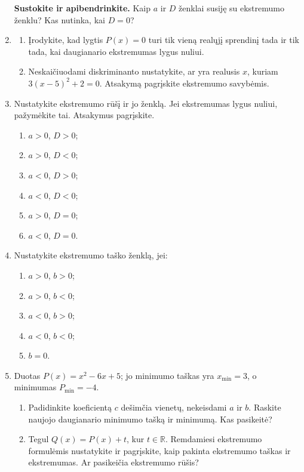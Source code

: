 \documentclass[12pt,a4paper]{article}
\begin{document}
\begin{enumerate}
\begin{enumerate}
\end{enumerate}
\par\medskip
\textbf{Sustokite ir apibendrinkite.} Kaip $a$ ir $D$ ženklai susiję su ekstremumo ženklu? Kas nutinka, kai $D=0$?
\item \begin{enumerate}
\item Įrodykite, kad lygtis $P(x)=0$ turi tik vieną realųjį sprendinį tada ir tik tada, kai daugianario ekstremumas lygus nuliui.
\item Neskaičiuodami diskriminanto nustatykite, ar yra realusis $x$, kuriam $3(x-5)^2+2=0$. Atsakymą pagrįskite ekstremumo savybėmis.
\end{enumerate}
\item Nustatykite ekstremumo rūšį ir jo ženklą. Jei ekstremumas lygus nuliui, pažymėkite tai. Atsakymus pagrįskite.
\begin{multicols}{2}\begin{enumerate}
\item $a>0$, $D>0$; \item $a>0$, $D<0$; \item $a<0$, $D>0$; \item $a<0$, $D<0$; \item $a>0$, $D=0$; \item $a<0$, $D=0$.
\end{enumerate}\end{multicols}
\item Nustatykite ekstremumo taško ženklą, jei:
\begin{multicols}{2}\begin{enumerate}
\item $a>0$, $b>0$; \item $a>0$, $b<0$; \item $a<0$, $b>0$; \item $a<0$, $b<0$; \item $b=0$.
\end{enumerate}\end{multicols}
\item Duotas $P(x)=x^2-6x+5$; jo minimumo taškas yra $x_{\min}=3$, o minimumas $P_{\min}=-4$.
\begin{enumerate}
\item Padidinkite koeficientą $c$ dešimčia vienetų, nekeisdami $a$ ir $b$. Raskite naujojo daugianario minimumo tašką ir minimumą. Kas pasikeitė?
\item Tegul $Q(x)=P(x)+t$, kur $t\in\mathbb R$. Remdamiesi ekstremumo formulėmis nustatykite ir pagrįskite, kaip pakinta ekstremumo taškas ir ekstremumas. Ar pasikeičia ekstremumo rūšis?

\end{enumerate}
\end{enumerate}
\end{document}
